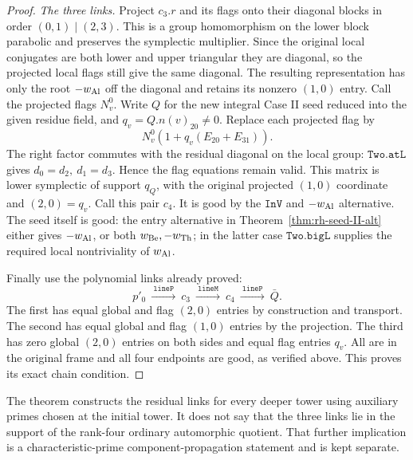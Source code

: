 \begin{proof}
\emph{The three links.}
Project \(c_3.r\) and its flags onto their diagonal
blocks in order \((0,1)\mid(2,3)\). This is a group
homomorphism on the lower block parabolic and preserves
the symplectic multiplier. Since the original local
conjugates are both lower and upper triangular they
are diagonal, so the projected local flags still give
the same diagonal. The resulting representation has
only the root \(-w_{\rm Al}\) off the diagonal and
retains its nonzero \((1,0)\) entry. Call the projected
flags \(N_v^0\). Write \(Q\) for the new integral
Case II seed reduced into the given residue field, and
\(q_v=Q.n(v)_{20}\ne0\). Replace each projected flag by
\[
 N_v^0(1+q_v(E_{20}+E_{31})).
\]
The right factor commutes with the residual diagonal
on the local group: \(\texttt{Two.atL}\) gives
\(d_0=d_2,\ d_1=d_3\). Hence the flag equations
remain valid. This matrix is lower symplectic of
support \(q_Q\), with the original projected
\((1,0)\) coordinate and \((2,0)=q_v\).
Call this pair \(c_4\). It is good by the
\(\texttt{InV}\) and \(-w_{\rm Al}\) alternative.
The seed itself is good: the entry alternative in
Theorem~\ref{thm:rh-seed-II-alt} either gives
\(-w_{\rm Al}\), or both \(w_{\rm Be},-w_{\rm Th}\);
in the latter case \(\texttt{Two.bigL}\) supplies
the required local nontriviality of \(w_{\rm Al}\).

Finally use the polynomial links already proved:
\[
 p'_0\ \xrightarrow{\ \texttt{lineP}\ }\ c_3\
 \xrightarrow{\ \texttt{lineM}\ }\ c_4\
 \xrightarrow{\ \texttt{lineP}\ }\ \bar Q .
\]
The first has equal global and flag \((2,0)\) entries
by construction and transport. The second has equal
global and flag \((1,0)\) entries by the projection.
The third has zero global \((2,0)\) entries on both
sides and equal flag entries \(q_v\).
All are in the original frame and all four endpoints
are good, as verified above. This proves its exact
chain condition.
\end{proof}

The theorem constructs the residual links for every deeper
tower using auxiliary primes chosen at the initial tower.
It does not say that the three links lie in the support of
the rank-four ordinary automorphic quotient. That further
implication is a characteristic-prime component-propagation
statement and is kept separate.
